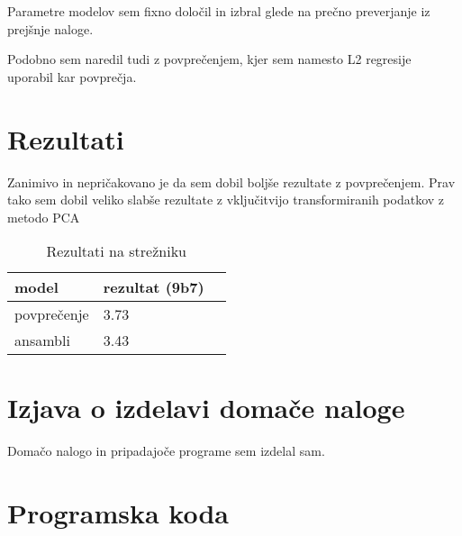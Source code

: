 \documentclass[a4paper,11pt]{article}
\begin{document}
Parametre modelov sem fixno določil in izbral glede na prečno preverjanje iz prejšnje naloge.

Podobno sem naredil tudi z povprečenjem, kjer sem namesto L2 regresije uporabil kar povprečja.
\section{Rezultati}

Zanimivo in nepričakovano je da sem dobil boljše rezultate z povprečenjem. Prav tako sem dobil veliko slabše rezultate z vključitvijo transformiranih podatkov z metodo PCA
\begin{table}[htbp]
\caption{Rezultati na strežniku}
\label{tab1}
\begin{center}
\begin{tabular}{llp{3cm}}
\hline
model & rezultat (9b7)\\
\hline
povprečenje & 3.73 \\
ansambli & 3.43 \\
\hline
\end{tabular}
\end{center}
\end{table}

\section{Izjava o izdelavi domače naloge}
Domačo nalogo in pripadajoče programe sem izdelal sam.

\appendix
\appendixpage


\section{\label{app-code}Programska koda}
\end{document}
